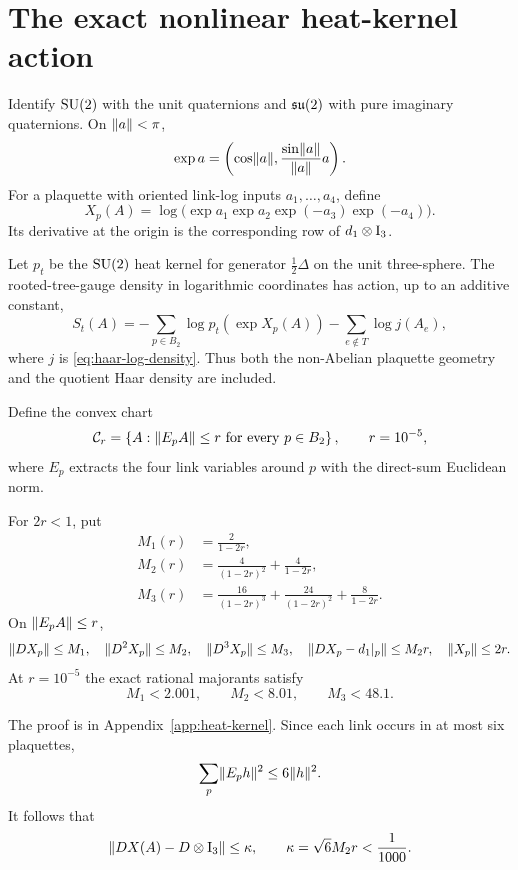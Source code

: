 \section{The exact nonlinear heat-kernel action}\label{sec:nonlinear}

Identify $\mathrm{SU}(2)$ with the unit quaternions and $\mathfrak{su}(2)$ with pure imaginary
quaternions.  On $\lVert a\rVert<\pi$,
\[
 \exp a=\left(\cos\lVert a\rVert,
   \frac{\sin\lVert a\rVert}{\lVert a\rVert}a\right).
\]
For a plaquette with oriented link-log inputs $a_1,\ldots,a_4$, define
\begin{equation}\label{eq:X-def}
 X_p(A)=\log\bigl(\exp a_1\exp a_2\exp(-a_3)\exp(-a_4)\bigr).
\end{equation}
Its derivative at the origin is the corresponding row of $d_1\otimes\mathrm I_3$.

Let $p_t$ be the $\mathrm{SU}(2)$ heat kernel for generator $\frac12\Delta$ on the
unit three-sphere.  The rooted-tree-gauge density in logarithmic coordinates
has action, up to an additive constant,
\begin{equation}\label{eq:exact-action}
 S_t(A)=-\sum_{p\in B_2}\log p_t(\exp X_p(A))
        -\sum_{e\notin T}\log j(A_e),
\end{equation}
where $j$ is \eqref{eq:haar-log-density}.  Thus both the non-Abelian plaquette
geometry and the quotient Haar density are included.

Define the convex chart
\begin{equation}\label{eq:chart}
 \mathcal C_r=\left\{A:\lVert E_pA\rVert\le r\text{ for every }p\in B_2\right\},
 \qquad r=10^{-5},
\end{equation}
where $E_p$ extracts the four link variables around $p$ with the direct-sum
Euclidean norm.

\begin{lemma}\label{lem:product-log}
For $2r<1$, put
\begin{align*}
 M_1(r)&=\frac2{1-2r},\\
 M_2(r)&=\frac4{(1-2r)^2}+\frac4{1-2r},\\
 M_3(r)&=\frac{16}{(1-2r)^3}
       +\frac{24}{(1-2r)^2}+\frac8{1-2r}.
\end{align*}
On $\lVert E_pA\rVert\le r$,
\[
 \lVert DX_p\rVert\le M_1,\quad \lVert D^2X_p\rVert\le M_2,\quad
 \lVert D^3X_p\rVert\le M_3,\quad
 \lVert DX_p-d_1|_p\rVert\le M_2r,\quad \lVert X_p\rVert\le2r.
\]
At $r=10^{-5}$ the exact rational majorants satisfy
\[
 M_1<2.001,\qquad M_2<8.01,\qquad M_3<48.1.
\]
\end{lemma}

The proof is in Appendix~\ref{app:heat-kernel}.  Since each link occurs in at
most six plaquettes,
\begin{equation}\label{eq:extraction}
 \sum_p\lVert E_ph\rVert^2\le6\lVert h\rVert^2.
\end{equation}
It follows that
\begin{equation}\label{eq:kappa}
 \lVert DX(A)-D\otimes\mathrm I_3\rVert\le\kappa,\qquad
 \kappa=\sqrt6M_2r<\frac1{1000}.
\end{equation}

